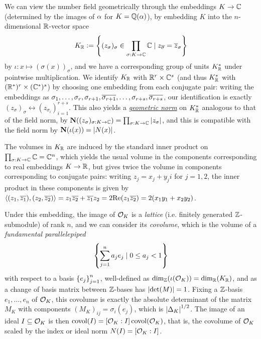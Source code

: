 \documentclass[11pt]{report}
\begin{document}
We can view the number field geometrically through the embeddings $K \to \mathbb{C}$ (determined by the images of $\alpha$ for $K = \mathbb{Q}(\alpha)$), by embedding $K$ into the $n$-dimensional $\mathbb{R}$-vector space 
$$
    K_{\mathbb{R}} \vcentcolon= \left\{  (z_\sigma)_{\sigma} \in \prod_{\sigma : K \to \mathbb{C}}\mathbb{C} \mid z_{\overline{\sigma}} = \overline{z}_\sigma  \right\}
$$
by $\iota : x \mapsto (\sigma(x))_{\sigma}$, and we have a corresponding group of units $K_{\mathbb{R}}^*$ under pointwise multiplication. We identify $K_{\mathbb{R}}$ with $\mathbb{R}^r \times \mathbb{C}^s$ (and thus $K_{\mathbb{R}}^*$ with $(\mathbb{R}^*)^r \times (\mathbb{C}^*)^s$) by choosing one embedding from each conjugate pair: writing the embeddings as $\sigma_1, \ldots, \sigma_r, \sigma_{r + 1}, \overline{\sigma_{r + 1}}, \ldots, \sigma_{r + s}, \overline{\sigma_{r + s}}$, our identification is exactly $(z_\sigma)_\sigma \leftrightarrow (z_{\sigma_i})_{i = 1}^{r + s}$. This also yields a \hyperlink{geomnorm}{\emph{geometric norm}} on $K_{\mathbb{R}}^*$ analogous to that of the field norm, by $\operatorname{\mathbf{N}}((z_\sigma)_{\sigma : K \to \mathbb{C}}) = \prod_{\sigma : K \to \mathbb{C}}\left| z_\sigma \right|$, and this is compatible with the field norm by $\operatorname{\mathbf{N}}(\iota(x)) = \left| N(x) \right|$.

The volumes in $K_{\mathbb{R}}$ are induced by the standard inner product on $\prod_{\sigma : K \to \mathbb{C}}\mathbb{C} = \mathbb{C}^n$, which yields the usual volume in the components corresponding to real embeddings $K \to \mathbb{R}$, but gives twice the volume in components corresponding to conjugate pairs: writing $z_j = x_j + y_ji$ for $j = 1, 2$, the inner product in these components is given by $\left\langle (z_1, \overline{z_1}), (z_2, \overline{z_2}) \right\rangle = z_1\overline{z_2} + \overline{z_1}z_2 = 2\text{Re}(z_1\overline{z_2}) = 2(x_1y_1 + x_2y_2)$.


Under this embedding, the image of $\mathcal{O}_K$ is a \emph{lattice} (i.e. finitely generated $\mathbb{Z}$-submodule) of rank $n$, and we can consider its \emph{covolume}, which is the volume of a \emph{fundamental parallelepiped} 
$$
    \left\{  \sum_{j = 1}^na_je_j \mid 0 \leq a_j < 1  \right\}
$$
with respect to a basis $\left\{  e_j  \right\}_{j = 1}^n$, well-defined as $\dim_{\mathbb{Z}}(\iota(\mathcal{O}_K)) = \dim_{\mathbb{R}}(K_{\mathbb{R}})$, and as a change of basis matrix between $\mathbb{Z}$-bases has $\left| \det(M) \right| = 1$. Fixing a $\mathbb{Z}$-basis $e_1, \ldots, e_n$ of $\mathcal{O}_K$, this covolume is exactly the absolute determinant of the matrix $M_K$ with components $(M_K)_{ij} = \sigma_i(e_j)$, which is $\left| \Delta_K \right|^{1/2}$. The image of an ideal $I \subseteq \mathcal{O}_K$ is then $\operatorname{covol}(I) = [\mathcal{O}_K : I]\operatorname{covol}(\mathcal{O}_K)$, that is, the covolume of $\mathcal{O}_K$ scaled by the index or ideal norm $N(I) = [\mathcal{O}_K : I]$.
\end{document}
